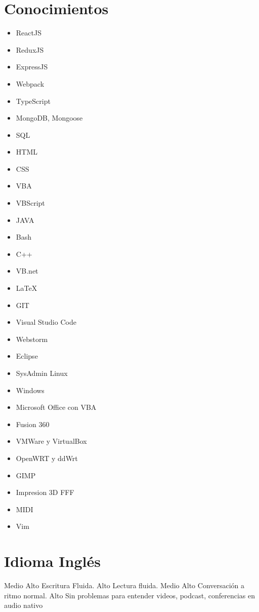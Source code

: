 \documentclass[draft,color,12pt,letterpaper,sans]{moderncv}
\begin{document}
\section{Conocimientos}
\begin{cvcolumns}
	{
		\begin{itemize}
			\item
				ReactJS
			\item
				ReduxJS
			\item
				ExpressJS
			\item
				Webpack
			\item
				TypeScript
			\item
				MongoDB, Mongoose
			\item
				SQL
			\item
				HTML
			\item
				CSS
			\item
				VBA
			\item	
				VBScript
			\item
				JAVA		
			\item
				Bash
			\item
				C++
			\item
				VB.net
			\item
				LaTeX
		\end{itemize}
	}
	

{
	\begin{itemize}
		\item
			GIT
		\item
			Visual Studio Code
		\item
			Webstorm
		\item
			Eclipse
		\item
			SysAdmin Linux
		\item
			Windows
		\item
			Microsoft Office con VBA
		\item
			Fusion 360
		\item
			VMWare y VirtualBox
		\item
			OpenWRT y ddWrt
		\item
			GIMP
		\item
			Impresion 3D FFF
		\item
			MIDI
		\item	
			Vim
	\end{itemize}
}

\end{cvcolumns}




\section{Idioma Ingl\'es}
{Medio Alto}
{Escritura Fluida.}
{Alto}
{Lectura fluida.}
{Medio Alto}
{Conversaci\'on a ritmo normal.}
{Alto}
{Sin problemas para entender videos, podcast, conferencias en audio nativo}
\end{document}
